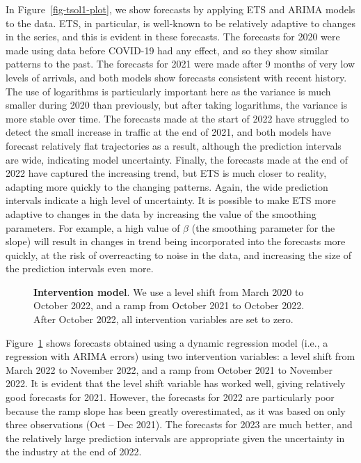 \documentclass[
  11pt,
  a4paper,
]{article}
\begin{document}
In Figure~\ref{fig-tsol1-plot}, we show forecasts by applying ETS and
ARIMA models to the data. ETS, in particular, is well-known to be
relatively adaptive to changes in the series, and this is evident in
these forecasts. The forecasts for 2020 were made using data before
COVID-19 had any effect, and so they show similar patterns to the past.
The forecasts for 2021 were made after 9 months of very low levels of
arrivals, and both models show forecasts consistent with recent history.
The use of logarithms is particularly important here as the variance is
much smaller during 2020 than previously, but after taking logarithms,
the variance is more stable over time. The forecasts made at the start
of 2022 have struggled to detect the small increase in traffic at the
end of 2021, and both models have forecast relatively flat trajectories
as a result, although the prediction intervals are wide, indicating
model uncertainty. Finally, the forecasts made at the end of 2022 have
captured the increasing trend, but ETS is much closer to reality,
adapting more quickly to the changing patterns. Again, the wide
prediction intervals indicate a high level of uncertainty. It is
possible to make ETS more adaptive to changes in the data by increasing
the value of the smoothing parameters. For example, a high value of
\(\beta\) (the smoothing parameter for the slope) will result in changes
in trend being incorporated into the forecasts more quickly, at the risk
of overreacting to noise in the data, and increasing the size of the
prediction intervals even more.

\begin{figure}[!b]


\caption{\label{fig-tsol2-plot}\textbf{Intervention model}. We use a
level shift from March 2020 to October 2022, and a ramp from October
2021 to October 2022. After October 2022, all intervention variables are
set to zero.}

\end{figure}%

Figure~\ref{fig-tsol2-plot} shows forecasts obtained using a dynamic
regression model (i.e., a regression with ARIMA errors) using two
intervention variables: a level shift from March 2022 to November 2022,
and a ramp from October 2021 to November 2022. It is evident that the
level shift variable has worked well, giving relatively good forecasts
for 2021. However, the forecasts for 2022 are particularly poor because
the ramp slope has been greatly overestimated, as it was based on only
three observations (Oct -- Dec 2021). The forecasts for 2023 are much
better, and the relatively large prediction intervals are appropriate
given the uncertainty in the industry at the end of 2022.
\end{document}
